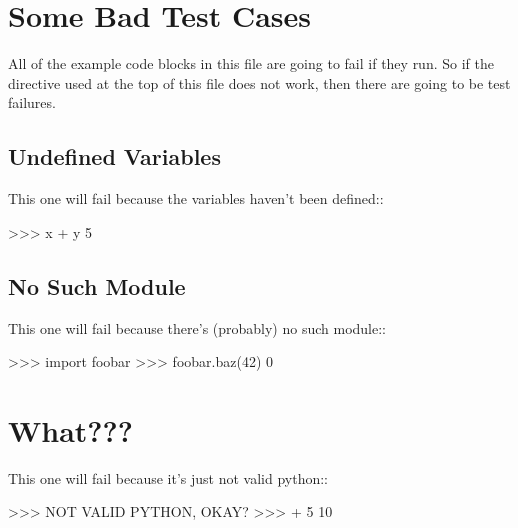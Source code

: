 \documentclass{article}
\begin{document}
\section{Some Bad Test Cases}

All of the example code blocks in this file are going to fail if they run. So
if the directive used at the top of this file does not work, then there are
going to be test failures.

\subsection{Undefined Variables}

This one will fail because the variables haven't been defined::

\begin{python}
>>> x + y
5

\end{python}


\subsection{No Such Module}

This one will fail because there's (probably) no such module::

\begin{python}
>>> import foobar
>>> foobar.baz(42)
0

\end{python}


\section{What???}

This one will fail because it's just not valid python::

\begin{python}
>>> NOT VALID PYTHON, OKAY?
>>> + 5
10

\end{python}
\end{document}
